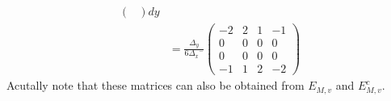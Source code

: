 \documentclass{mc2013}
\newcommand\bs{\boldsymbol}
\newcommand\tf{\varphi}
\renewcommand{\(}{\left(}
\renewcommand{\)}{\right)}
\renewcommand{\[}{\left[}
\renewcommand{\]}{\right]}
\begin{document}
\begin{itemize}
\begin{equation}
\begin{split}
\begin{pmatrix}
\end{pmatrix}
dy\\
&= \frac{{\Delta _y}}{6{\Delta _x}^-}
\begin{pmatrix}
-2 & 2 & 1 & -1 \\
0 & 0 & 0 & 0 \\
0 & 0 & 0 & 0 \\
-1 & 1 & 2 & -2
\end{pmatrix}
\end{split}
\end{equation}
Acutally note that these matrices can also be obtained from $E_{M,v}$ and $E_{M,v}^c$.
%

\end{itemize}
\end{document}
